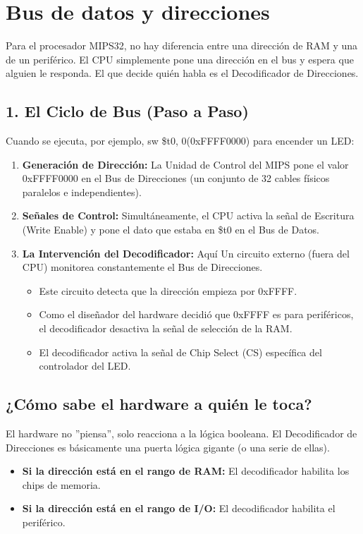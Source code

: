 \documentclass[]{article}
\begin{document}
\section{Bus de datos y direcciones}
	Para el procesador MIPS32, no hay diferencia entre una dirección de RAM y una de un periférico. El CPU simplemente pone una dirección en el bus y espera que alguien le responda. El que decide quién habla es el Decodificador de Direcciones.
	
	\subsection{1. El Ciclo de Bus (Paso a Paso)}
		Cuando se ejecuta, por ejemplo, sw \$t0, 0(0xFFFF0000) para encender un LED:
		\begin{enumerate}
			\item \textbf{Generación de Dirección:} La Unidad de Control del MIPS pone el valor 0xFFFF0000 en el Bus de Direcciones (un conjunto de 32 cables físicos paralelos e independientes).
			\item \textbf{Señales de Control:} Simultáneamente, el CPU activa la señal de Escritura (Write Enable) y pone el dato que estaba en \$t0 en el Bus de Datos.
			\item  \textbf{La Intervención del Decodificador: }Aquí Un circuito externo (fuera del CPU) monitorea constantemente el Bus de Direcciones.
			\begin{itemize}
				\item Este circuito detecta que la dirección empieza por 0xFFFF.
				\item Como el diseñador del hardware decidió que 0xFFFF es para periféricos, el decodificador desactiva la señal de selección de la RAM.
				\item El decodificador activa la señal de Chip Select (CS) específica del controlador del LED.
			\end{itemize}
		\end{enumerate}
		
	\subsection{¿Cómo sabe el hardware a quién le toca?}
		El hardware no ''piensa'', solo reacciona a la lógica booleana. El Decodificador de Direcciones es básicamente una puerta lógica gigante (o una serie de ellas).
		\begin{itemize}
			\item \textbf{ Si la dirección está en el rango de RAM:} El decodificador habilita los chips de memoria.
			\item \textbf{Si la dirección está en el rango de I/O:} El decodificador habilita el periférico.
		\end{itemize}
		
\end{document}
